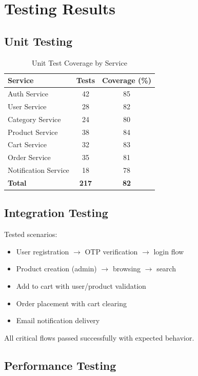 \section{Testing Results}

\subsection{Unit Testing}

\begin{table}[h!]
\centering
\caption{Unit Test Coverage by Service}
\begin{tabular}{|l|c|c|}
\hline
\textbf{Service} & \textbf{Tests} & \textbf{Coverage (\%)} \\
\hline
Auth Service & 42 & 85 \\
User Service & 28 & 82 \\
Category Service & 24 & 80 \\
Product Service & 38 & 84 \\
Cart Service & 32 & 83 \\
Order Service & 35 & 81 \\
Notification Service & 18 & 78 \\
\hline
\textbf{Total} & \textbf{217} & \textbf{82} \\
\hline
\end{tabular}
\end{table}

\subsection{Integration Testing}

Tested scenarios:
\begin{itemize}
    \item User registration $\rightarrow$ OTP verification $\rightarrow$ login flow
    \item Product creation (admin) $\rightarrow$ browsing $\rightarrow$ search
    \item Add to cart with user/product validation
    \item Order placement with cart clearing
    \item Email notification delivery
\end{itemize}

All critical flows passed successfully with expected behavior.

\subsection{Performance Testing}

